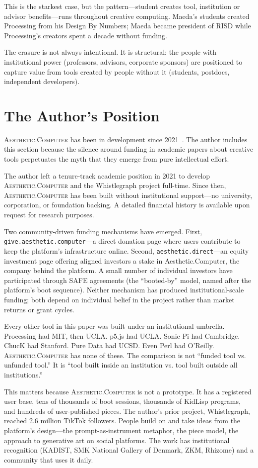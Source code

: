 \documentclass[10pt,letterpaper,twocolumn]{article}
\newcommand{\ac}{\textsc{Aesthetic.Computer}}
\begin{document}
This is the starkest case, but the pattern---student creates tool, institution or advisor benefits---runs throughout creative computing. Maeda's students created Processing from his Design By Numbers; Maeda became president of RISD while Processing's creators spent a decade without funding.

The erasure is not always intentional. It is structural: the people with institutional power (professors, advisors, corporate sponsors) are positioned to capture value from tools created by people without it (students, postdocs, independent developers).

\section{The Author's Position}

\ac{} has been in development since 2021~\citep{scudder2026ac}. The author includes this section because the silence around funding in academic papers about creative tools perpetuates the myth that they emerge from pure intellectual effort.

The author left a tenure-track academic position in 2021 to develop \ac{} and the Whistlegraph project full-time. Since then, \ac{} has been built without institutional support---no university, corporation, or foundation backing. A detailed financial history is available upon request for research purposes.

Two community-driven funding mechanisms have emerged. First, \texttt{give.aesthetic.computer}---a direct donation page where users contribute to keep the platform's infrastructure online. Second, \texttt{aesthetic.direct}---an equity investment page offering aligned investors a stake in Aesthetic.Computer, the company behind the platform. A small number of individual investors have participated through SAFE agreements (the ``booted-by'' model, named after the platform's boot sequence). Neither mechanism has produced institutional-scale funding; both depend on individual belief in the project rather than market returns or grant cycles.

Every other tool in this paper was built under an institutional umbrella. Processing had MIT, then UCLA. p5.js had UCLA. Sonic Pi had Cambridge. ChucK had Stanford. Pure Data had UCSD. Even Perl had O'Reilly. \ac{} has none of these. The comparison is not ``funded tool vs. unfunded tool.'' It is ``tool built inside an institution vs. tool built outside all institutions.''

This matters because \ac{} is not a prototype. It has a registered user base, tens of thousands of boot sessions, thousands of KidLisp programs, and hundreds of user-published pieces. The author's prior project, Whistlegraph, reached 2.6 million TikTok followers. People build on and take ideas from the platform's design---the prompt-as-instrument metaphor, the piece model, the approach to generative art on social platforms. The work has institutional recognition (KADIST, SMK National Gallery of Denmark, ZKM, Rhizome) and a community that uses it daily.
\end{document}
